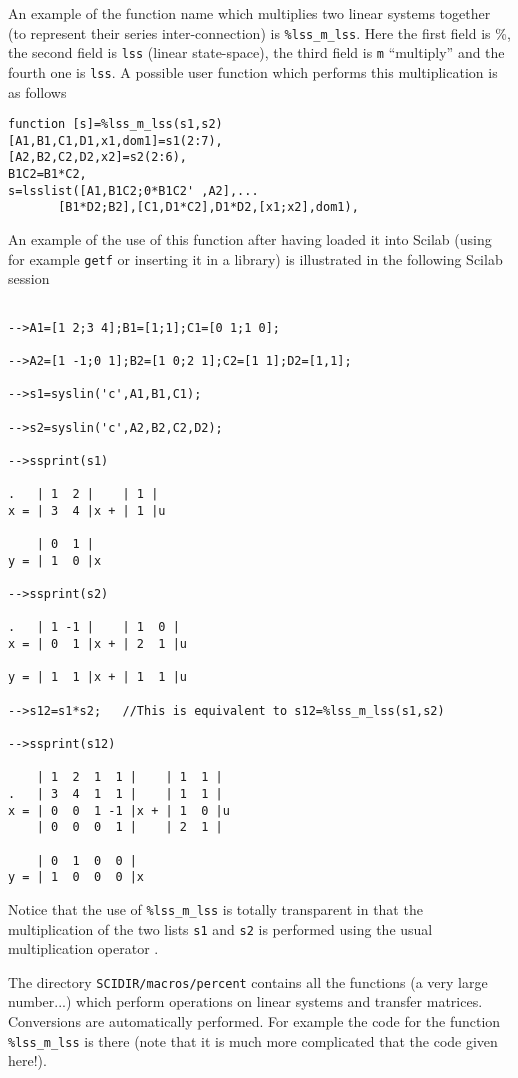 	An example of the function name which multiplies two
linear systems together (to represent their series inter-connection)
is {\tt \%lss\_m\_lss}.  Here the first field is \%, the second field is 
{\tt lss} (linear state-space), the third field is {\tt m} ``multiply''
and the fourth one is {\tt lss}. A possible user function which performs
this multiplication is as follows
\begin{verbatim}
function [s]=%lss_m_lss(s1,s2)
[A1,B1,C1,D1,x1,dom1]=s1(2:7),
[A2,B2,C2,D2,x2]=s2(2:6),
B1C2=B1*C2,
s=lsslist([A1,B1C2;0*B1C2' ,A2],...
       [B1*D2;B2],[C1,D1*C2],D1*D2,[x1;x2],dom1),
\end{verbatim}
An example of the use of this function after having loaded it into
Scilab (using for example {\tt getf} or inserting it in a library) 
is illustrated in the following Scilab session
\begin{verbatim}
 
-->A1=[1 2;3 4];B1=[1;1];C1=[0 1;1 0];
 
-->A2=[1 -1;0 1];B2=[1 0;2 1];C2=[1 1];D2=[1,1];
 
-->s1=syslin('c',A1,B1,C1);
 
-->s2=syslin('c',A2,B2,C2,D2);
 
-->ssprint(s1)
 
.   | 1  2 |    | 1 |    
x = | 3  4 |x + | 1 |u   
 
    | 0  1 |    
y = | 1  0 |x   
 
-->ssprint(s2)
 
.   | 1 -1 |    | 1  0 |    
x = | 0  1 |x + | 2  1 |u   
 
y = | 1  1 |x + | 1  1 |u   
 
-->s12=s1*s2;   //This is equivalent to s12=%lss_m_lss(s1,s2)
 
-->ssprint(s12)
 
    | 1  2  1  1 |    | 1  1 |    
.   | 3  4  1  1 |    | 1  1 |    
x = | 0  0  1 -1 |x + | 1  0 |u   
    | 0  0  0  1 |    | 2  1 |    
 
    | 0  1  0  0 |    
y = | 1  0  0  0 |x   
\end{verbatim}
Notice that the use of {\tt \%lss\_m\_lss} is totally transparent in
that the multiplication of the two lists {\tt s1} and {\tt s2}
is performed using the usual multiplication operator {\tt *}.

The directory {\tt SCIDIR/macros/percent} contains all the functions
(a very large number...) which perform operations on linear systems
and transfer matrices. Conversions are automatically performed.
For example the code for the function {\tt \%lss\_m\_lss} is there (note
that it is much more complicated that the code given here!).
